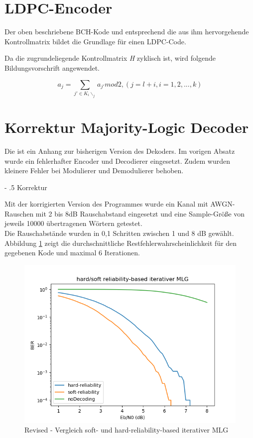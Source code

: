 \documentclass[11pt,a4paper]{article}
\makeatletter
\renewcommand\paragraph{%
\@startsection{paragraph}{4}{0mm}%
{-\baselineskip}%
{.5\baselineskip}%
{\normalfont\normalsize\bfseries}}
\makeatother
\begin{document}
	

\section{LDPC-Encoder}
Der oben beschriebene BCH-Kode und entsprechend die aus ihm hervorgehende Kontrollmatrix bildet die Grundlage für einen LDPC-Code.

Da die zugrundeliegende Kontrollmatrix \textit{H} zyklisch ist, wird folgende Bildungsvorschrift angewendet.

\[ a_{j} = \sum_{j′∈K_{i}\backslash_{j}} a_{j′}  mod  2 , (j = l + i, i = 1, 2, ..., k)  \]

\section{Korrektur Majority-Logic Decoder}

Die ist ein Anhang zur bisherigen Version des Dekoders. Im vorigen Absatz wurde ein fehlerhafter Encoder und Decodierer eingesetzt. Zudem wurden kleinere Fehler bei Modulierer und Demodulierer behoben.

\paragraph{Korrektur} 

Mit der korrigierten Version des Programmes wurde ein Kanal mit AWGN-Rauschen mit 2 bis 8dB Rauschabstand eingesetzt und eine Sample-Größe von jeweils 10000 übertragenen Wörtern getestet. \\

Die Rauschabstände wurden in 0,1 Schritten zwischen 1 und 8 dB gewählt. Abbildung \ref{fig:plot2} zeigt die durchschnittliche Restfehlerwahrscheinlichkeit für den gegebenen Kode und maximal 6 Iterationen. \\

\begin{figure}[ht]
	\includegraphics[width=\linewidth]{foo3.png}
	\caption{Revised - Vergleich soft- und hard-reliability-based iterativer MLG}
	\label{fig:plot2}
\end{figure}
\end{document}
